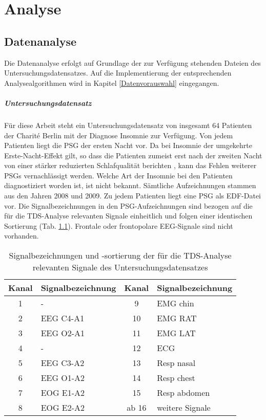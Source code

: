 \chapter{Analyse}\label{analyse}

\section{Datenanalyse}\label{datenanalyse}

Die Datenanalyse erfolgt auf Grundlage der zur Verfügung stehenden Dateien des Untersuchungsdatensatzes. Auf die Implementierung der entsprechenden Analysealgorithmen wird in Kapitel \ref{Datenvorauswahl} eingegangen.

\paragraph{Untersuchungsdatensatz} Für diese Arbeit steht ein Untersuchungsdatensatz von insgesamt 64 Patienten der Charit\'{e} Berlin mit der Diagnose Insomnie zur Verfügung. Von jedem Patienten liegt die \acs{PSG} der ersten Nacht vor. Da bei Insomnie der umgekehrte Erste-Nacht-Effekt gilt, so dass die Patienten zumeist erst nach der zweiten Nacht von einer stärker reduzierten Schlafqualität berichten \parencite{happe_schlafmedizin_2009}, kann das Fehlen weiterer \acs{PSG}s vernachlässigt werden. Welche Art der Insomnie bei den Patienten diagnostiziert worden ist, ist nicht bekannt. Sämtliche Aufzeichnungen stammen aus den Jahren 2008 und 2009. Zu jedem Patienten liegt eine \acs{PSG} als \acs{EDF}-Datei vor. Die Signalbezeichnungen in den \acs{PSG}-Aufzeichnungen sind bezogen auf die für die \acs{TDS}-Analyse relevanten Signale einheitlich und folgen einer identischen Sortierung (Tab. \ref{tab:labels}). Frontale oder frontopolare \acs{EEG}-Signale sind nicht vorhanden.

\begin{table}[H]
\centering 
\begin{tabularx}{0.76\textwidth}{cXcX}
\toprule
\multicolumn{1}{c}{\textbf{Kanal}} & \multicolumn{1}{l}{\textbf{Signalbezeichnung}} & \multicolumn{1}{l}{\textbf{Kanal}} & \multicolumn{1}{l}{\textbf{Signalbezeichnung}}\\
\midrule 
1 & - & 9 & EMG chin\\
2 & EEG C4-A1 & 10 & EMG RAT\\
3 & EEG O2-A1 & 11 & EMG LAT\\
4 & - & 12 & ECG\\
5 & EEG C3-A2 & 13 & Resp nasal\\
6 & EEG O1-A2 & 14 & Resp chest\\
7 & EOG E1-A2 & 15 & Resp abdomen\\
8 & EOG E2-A2 & ab 16 & weitere Signale\\
\bottomrule
\end{tabularx}
\caption[Einheitliche Signalbezeichnungen und -sortierung]{Signalbezeichnungen und -sortierung der für die \acs{TDS}-Analyse relevanten Signale des Untersuchungsdatensatzes}
\label{tab:labels}
\end{table}

